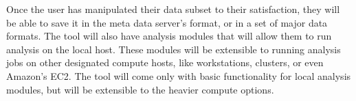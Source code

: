Once the user has manipulated their data subset to their satisfaction, they
will be able to save it in the meta data server's format, or in a set of major
data formats. The tool will also have analysis modules that will allow them
to run analysis on the local host. These modules will be extensible to running 
analysis jobs on other designated compute hosts, like workstations, clusters,
or even Amazon's EC2. The tool will come only with basic functionality for 
local analysis modules, but will be extensible to the heavier compute options.



